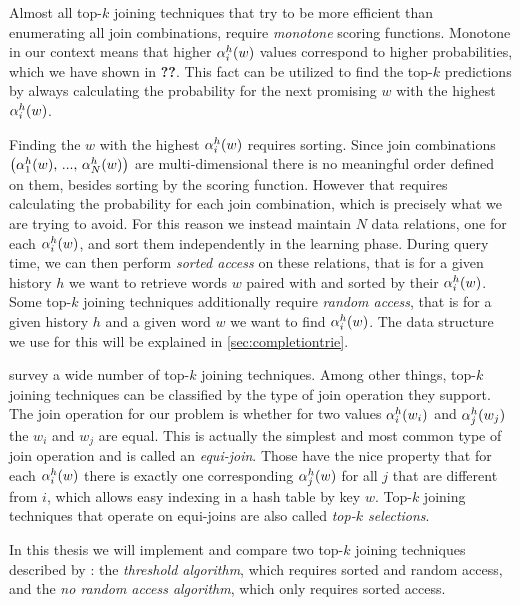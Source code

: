 Almost all top-$k$ joining techniques that try to be more efficient than
enumerating all join combinations, require \emph{monotone} scoring functions.
Monotone in our context means that higher $\alpha^h_i(w)$ values correspond
to higher probabilities, which we have shown in \textbf{??}.
This fact can be utilized to find the top-$k$ predictions by always calculating
the probability for the next promising $w$ with the highest $\alpha^h_i(w)$.

Finding the $w$ with the highest $\alpha^h_i(w)$ requires sorting.
Since join combinations
$\left(\alpha^h_1(w), \, ..., \, \alpha^h_N(w)\right)$ are multi-dimensional
there is no meaningful order defined on them, besides sorting by the scoring
function.
However that requires calculating the probability for each join
combination, which is precisely what we are trying to avoid.
For this reason we instead maintain $N$ data relations, one for each
$\alpha^h_i(w)$, and sort them independently in the learning phase.
During query time, we can then perform \emph{sorted access} on these relations,
that is for a given history $h$ we want to retrieve words $w$ paired with and
sorted by their $\alpha^h_i(w)$.
Some top-$k$ joining techniques additionally require \emph{random access},
that is for a given history $h$ and a given word $w$ we want to find
$\alpha^h_i(w)$.
The data structure we use for this will be explained in
\cref{sec:completiontrie}.

\textcite{Ilyas2008} survey a wide number of top-$k$ joining techniques.
Among other things, top-$k$ joining techniques can be classified by the type
of join operation they support.
The join operation for our problem is whether for two values $\alpha^h_i(w_i)$
and $\alpha^h_j(w_j)$ the $w_i$ and $w_j$ are equal.
This is actually the simplest and most common type of join operation and is
called an \emph{equi-join}.
Those have the nice property that for each $\alpha^h_i(w)$ there is exactly one
corresponding $\alpha^h_j(w)$ for all $j$ that are different from $i$, which
allows easy indexing in a hash table by key $w$.
Top-$k$ joining techniques that operate on equi-joins are also called
\emph{top-$k$ selections}.

In this thesis we will implement and compare two top-$k$ joining techniques
described by \textcite{Fagin2001}: the \emph{threshold algorithm}, which
requires sorted and random access, and the \emph{no random access algorithm},
which only requires sorted access.

